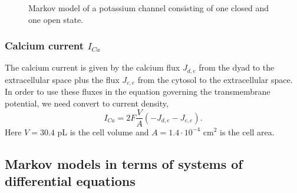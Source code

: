 \begin{figure}[ptb]
\begin{center}
\end{center}
\caption{Markov model of a potassium channel
consisting of one closed and one open state. }
\label{K1}
\end{figure}


\subsubsection{Calcium current $I_{Ca}$}

The calcium current is given by the calcium flux  $J_{d,e}$ from the dyad to the extracellular space plus the flux $J_{c,e}$ from the cytosol to the extracellular space.
In order to use these fluxes  in the equation governing the transmembrane potential, we need convert to current density,
\begin{equation}
I_{Ca}= 2 F\frac{V}{A} (-J_{d,e}-J_{c,e}).   \label{I_Ca}
\end{equation}
Here $V=30.4$ pL is the cell volume and $A=1.4\cdot 10^{-4} \text{ cm}^2$ is the cell area.

\subsection[Markov models as ODEs]{Markov models in terms of systems of differential equations}

